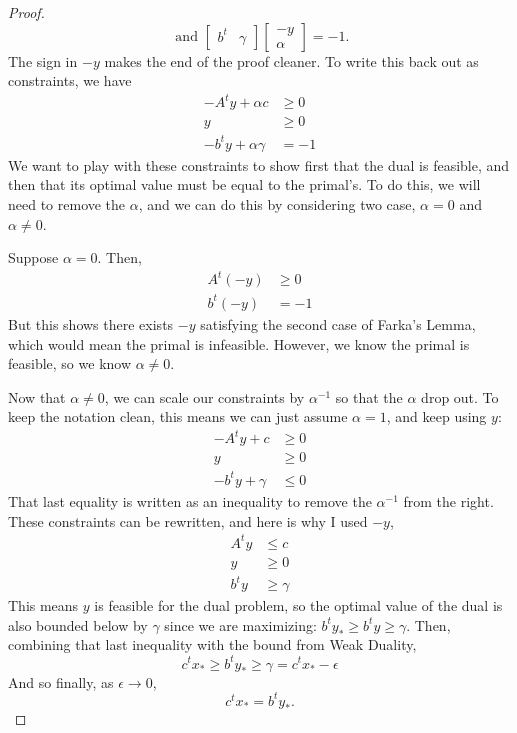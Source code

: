 \documentclass{article}
\begin{document}
\begin{proof}
\[		\text{ and }
		\begin{bmatrix} b^t & \gamma \end{bmatrix}\begin{bmatrix} -y \\ \alpha \end{bmatrix} = -1
		\text{.}
	\]
	The sign in $-y$ makes the end of the proof cleaner. To write this back out as constraints, we have
	\begin{align*}
		-A^t y + \alpha c &\ge 0 \\
		y &\ge 0 \\
		-b^t y + \alpha \gamma &= - 1
	\end{align*}
	We want to play with these constraints to show first that the dual is feasible, and then that its
	optimal value must be equal to the primal's. To do this, we will need to remove the $\alpha$, and
	we can do this by considering two case, $\alpha = 0$ and $\alpha \neq 0$.

	Suppose $\alpha = 0$. Then,
	\begin{align*}
		A^t (-y) &\ge 0 \\
		b^t (-y) &= - 1
	\end{align*}
	But this shows there exists $-y$ satisfying the second case of Farka's Lemma, which would mean the
	primal is infeasible. However, we know the primal is feasible, so we know $\alpha \neq 0$.

	Now that $\alpha \neq 0$, we can scale our constraints by $\alpha^{-1}$ so that the $\alpha$ drop
	out. To keep the notation clean, this means we can just assume $\alpha = 1$, and keep using $y$:
	\begin{align*}
		-A^t y + c &\ge 0 \\
		y &\ge 0 \\
		-b^t y + \gamma &\le 0
	\end{align*}
	That last equality is written as an inequality to remove the $\alpha^{-1}$ from the right. These
	constraints can be rewritten, and here is why I used $-y$,
	\begin{align*}
		A^t y &\le c \\
		y &\ge 0 \\
		b^t y &\ge \gamma
	\end{align*}
	This means $y$ is feasible for the dual problem, so the optimal value of the dual is also bounded
	below by $\gamma$ since we are maximizing: $b^ty_* \ge b^t y \ge \gamma$. Then, combining that last
	inequality with the bound from Weak Duality,
	\[ c^tx_* \ge b^t y_* \ge \gamma = c^tx_* - \epsilon \]
	And so finally, as $\epsilon \to 0$,
	\[ c^tx_* = b^t y_* \text{.}\]
\end{proof}
\end{document}
